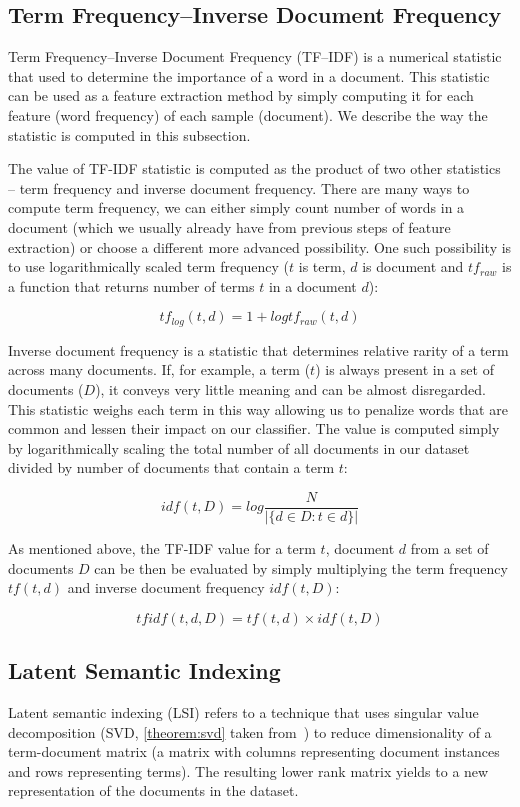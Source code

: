\subsection{Term Frequency--Inverse Document Frequency}

Term Frequency--Inverse Document Frequency (TF--IDF) is a numerical statistic that used to determine the importance of a word in a document. This statistic can be used as a feature extraction method by simply computing it for each feature (word frequency) of each sample (document). We describe the way the statistic is computed in this subsection.

The value of TF-IDF statistic is computed as the product of two other statistics -- term frequency and inverse document frequency. There are many ways to compute term frequency, we can either simply count number of words in a document (which we usually already have from previous steps of feature extraction) or choose a different more advanced possibility. One such possibility is to use logarithmically scaled term frequency ($t$ is term, $d$ is document and $tf_{raw}$ is a function that returns number of terms $t$ in a document $d$):

$$tf_{log}(t,d) = 1 + log tf_{raw}(t,d)$$

Inverse document frequency is a statistic that determines relative rarity of a term across many documents. If, for example, a term ($t$) is always present in a set of documents ($D$), it conveys very little meaning and can be almost disregarded. This statistic weighs each term in this way allowing us to penalize words that are common and lessen their impact on our classifier. The value is computed simply by logarithmically scaling the total number of all documents in our dataset divided by number of documents that contain a term $t$:

$$idf(t, D) = log \frac{N}{|\{d \in D : t \in d\}|}$$

As mentioned above, the TF-IDF value for a term $t$, document $d$ from a set of documents $D$ can be then be evaluated by simply multiplying the term frequency $tf(t,d)$ and inverse document frequency $idf(t,D)$:

$$tfidf(t,d,D) = tf(t,d) \times idf(t,D)$$

\subsection{Latent Semantic Indexing}

Latent semantic indexing (LSI) refers to a technique that uses singular value decomposition (SVD, \autoref{theorem:svd} taken from~\cite{manning2008introduction}) to reduce dimensionality of a term-document matrix (a matrix with columns representing document instances and rows representing terms). The resulting lower rank matrix yields to a new representation of the documents in the dataset.

